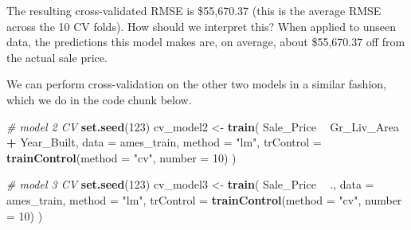 \documentclass[]{krantz}
\makeatletter
\newenvironment{Shaded}{\begin{snugshade}}{\end{snugshade}}
\newcommand{\CommentTok}[1]{\textcolor[rgb]{0.37,0.37,0.37}{\textit{#1}}}
\newcommand{\DataTypeTok}[1]{\textcolor[rgb]{0.27,0.27,0.27}{#1}}
\newcommand{\DecValTok}[1]{\textcolor[rgb]{0.06,0.06,0.06}{#1}}
\newcommand{\KeywordTok}[1]{\textcolor[rgb]{0.27,0.27,0.27}{\textbf{#1}}}
\newcommand{\NormalTok}[1]{#1}
\newcommand{\OperatorTok}[1]{\textcolor[rgb]{0.43,0.43,0.43}{\textbf{#1}}}
\newcommand{\StringTok}[1]{\textcolor[rgb]{0.5,0.5,0.5}{#1}}
\newenvironment{kframe}{%
\medskip{}
\setlength{\fboxsep}{.8em}
 \def\at@end@of@kframe{}%
 \ifinner\ifhmode%
  \def\at@end@of@kframe{\end{minipage}}%
  \begin{minipage}{\columnwidth}%
 \fi\fi%
 \def\FrameCommand##1{\hskip\@totalleftmargin \hskip-\fboxsep
 \colorbox{shadecolor}{##1}\hskip-\fboxsep
     \hskip-\linewidth \hskip-\@totalleftmargin \hskip\columnwidth}%
 \MakeFramed {\advance\hsize-\width
   \@totalleftmargin\z@ \linewidth\hsize
   \@setminipage}}%
 {\par\unskip\endMakeFramed%
 \at@end@of@kframe}
\renewenvironment{Shaded}{\begin{kframe}}{\end{kframe}}
\makeatother
\begin{document}
The resulting cross-validated RMSE is \$55,670.37 (this is the average RMSE across the 10 CV folds). How should we interpret this? When applied to unseen data, the predictions this model makes are, on average, about \$55,670.37 off from the actual sale price.

We can perform cross-validation on the other two models in a similar fashion, which we do in the code chunk below.

\begin{Shaded}
\begin{Highlighting}[]
\CommentTok{# model 2 CV}
\KeywordTok{set.seed}\NormalTok{(}\DecValTok{123}\NormalTok{)}
\NormalTok{cv_model2 <-}\StringTok{ }\KeywordTok{train}\NormalTok{(}
\NormalTok{  Sale_Price }\OperatorTok{~}\StringTok{ }\NormalTok{Gr_Liv_Area }\OperatorTok{+}\StringTok{ }\NormalTok{Year_Built, }
  \DataTypeTok{data =}\NormalTok{ ames_train, }
  \DataTypeTok{method =} \StringTok{"lm"}\NormalTok{,}
  \DataTypeTok{trControl =} \KeywordTok{trainControl}\NormalTok{(}\DataTypeTok{method =} \StringTok{"cv"}\NormalTok{, }\DataTypeTok{number =} \DecValTok{10}\NormalTok{)}
\NormalTok{)}

\CommentTok{# model 3 CV}
\KeywordTok{set.seed}\NormalTok{(}\DecValTok{123}\NormalTok{)}
\NormalTok{cv_model3 <-}\StringTok{ }\KeywordTok{train}\NormalTok{(}
\NormalTok{  Sale_Price }\OperatorTok{~}\StringTok{ }\NormalTok{., }
  \DataTypeTok{data =}\NormalTok{ ames_train, }
  \DataTypeTok{method =} \StringTok{"lm"}\NormalTok{,}
  \DataTypeTok{trControl =} \KeywordTok{trainControl}\NormalTok{(}\DataTypeTok{method =} \StringTok{"cv"}\NormalTok{, }\DataTypeTok{number =} \DecValTok{10}\NormalTok{)}
\NormalTok{)}


\end{Highlighting}
\end{Shaded}
\end{document}

